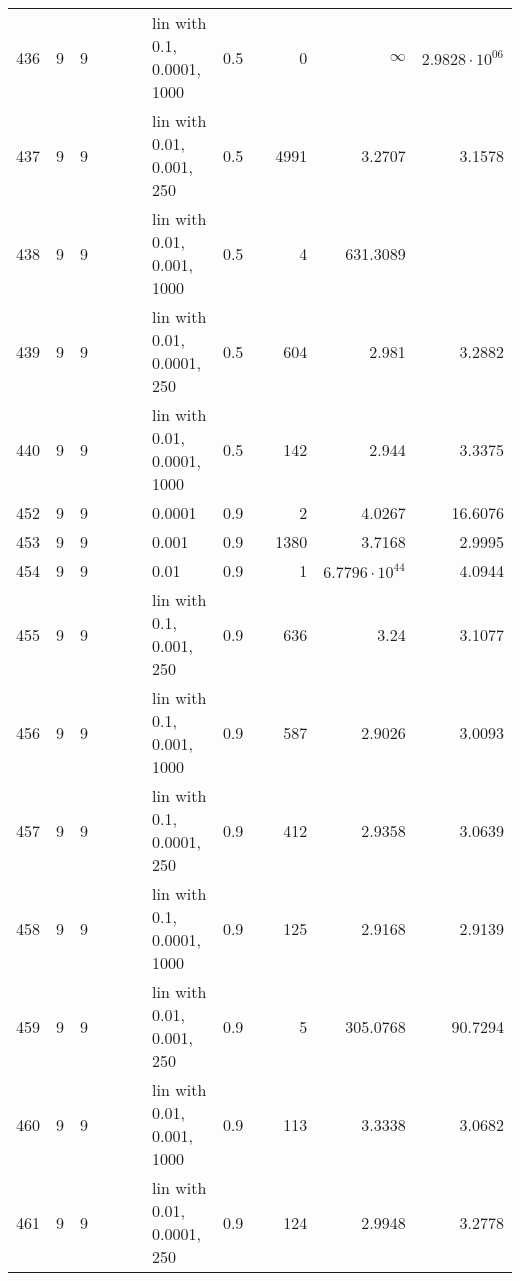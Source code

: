 \begin{longtable}{lrrrrrlrrrrr}
 436 &       9 & 9 &   &   &   &  lin with 0.1, 0.0001, 1000 &  0.5 &        &       0 &               $\infty$ &  $2.9828\cdot 10^{06}$ \\
 437 &       9 & 9 &   &   &   &   lin with 0.01, 0.001, 250 &  0.5 &        &    4991 &                 3.2707 &                 3.1578 \\
 438 &       9 & 9 &   &   &   &  lin with 0.01, 0.001, 1000 &  0.5 &        &       4 &               631.3089 &                        \\
 439 &       9 & 9 &   &   &   &  lin with 0.01, 0.0001, 250 &  0.5 &        &     604 &                  2.981 &                 3.2882 \\
 440 &       9 & 9 &   &   &   & lin with 0.01, 0.0001, 1000 &  0.5 &        &     142 &                  2.944 &                 3.3375 \\
 452 &       9 & 9 &   &   &   &                      0.0001 &  0.9 &        &       2 &                 4.0267 &                16.6076 \\
 453 &       9 & 9 &   &   &   &                       0.001 &  0.9 &        &    1380 &                 3.7168 &                 2.9995 \\
 454 &       9 & 9 &   &   &   &                        0.01 &  0.9 &        &       1 &  $6.7796\cdot 10^{44}$ &                 4.0944 \\
 455 &       9 & 9 &   &   &   &    lin with 0.1, 0.001, 250 &  0.9 &        &     636 &                   3.24 &                 3.1077 \\
 456 &       9 & 9 &   &   &   &   lin with 0.1, 0.001, 1000 &  0.9 &        &     587 &                 2.9026 &                 3.0093 \\
 457 &       9 & 9 &   &   &   &   lin with 0.1, 0.0001, 250 &  0.9 &        &     412 &                 2.9358 &                 3.0639 \\
 458 &       9 & 9 &   &   &   &  lin with 0.1, 0.0001, 1000 &  0.9 &        &     125 &                 2.9168 &                 2.9139 \\
 459 &       9 & 9 &   &   &   &   lin with 0.01, 0.001, 250 &  0.9 &        &       5 &               305.0768 &                90.7294 \\
 460 &       9 & 9 &   &   &   &  lin with 0.01, 0.001, 1000 &  0.9 &        &     113 &                 3.3338 &                 3.0682 \\
 461 &       9 & 9 &   &   &   &  lin with 0.01, 0.0001, 250 &  0.9 &        &     124 &                 2.9948 &                 3.2778 \\

\end{longtable}
